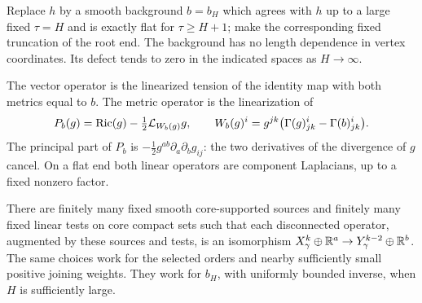 Replace $h$ by a smooth background $b=b_H$ which agrees with $h$
up to a large fixed $\tau=H$ and is exactly flat for $\tau\ge H+1$;
make the corresponding fixed truncation of the root end.  The
background has no length dependence in vertex coordinates.  Its
defect tends to zero in the indicated spaces as $H\to\infty$.

The vector operator is the linearized tension of the identity map
with both metrics equal to $b$.  The metric operator is the
linearization of
\begin{equation}
 P_b(g)=\operatorname{Ric}(g)-\tfrac12\mathcal L_{W_b(g)}g,
 \qquad W_b(g)^i=g^{jk}\bigl(\Gamma(g)^i_{jk}-\Gamma(b)^i_{jk}\bigr).
 \label{ell:deturck}
\end{equation}
The principal part of $P_b$ is
$-\frac12g^{ab}\partial_a\partial_bg_{ij}$: the two derivatives of
the divergence of $g$ cancel.  On a flat end both linear operators
are component Laplacians, up to a fixed nonzero factor.

\begin{lemma}
\label{ell:disconnected-inverse}
There are finitely many fixed smooth core-supported sources and
finitely many fixed linear tests on core compact sets such that
each disconnected operator, augmented by these sources and tests,
is an isomorphism $X^k_\gamma\oplus\mathbb{R}^a\to
Y^{k-2}_\gamma\oplus\mathbb{R}^b$.  The same choices work for the selected
orders and nearby sufficiently small positive joining weights.
They work for $b_H$, with uniformly bounded inverse, when $H$ is
sufficiently large.
\end{lemma}

